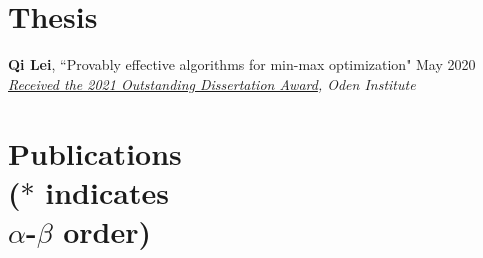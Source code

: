 \documentclass[margin, 10pt]{res} %
\begin{document}
\begin{resume}
\begin{itemize}[noitemsep]
\end{itemize}








\section{Thesis} 
\textbf{Qi Lei}, ``Provably effective algorithms for min-max optimization" \hfill{May 2020} \\ 
\textit{\href{https://www.oden.utexas.edu/news-and-events/news/Oden-Institute-Outstanding-Dissertation-Award-Winner-2021/}{Received the 2021 Outstanding Dissertation Award}, Oden Institute}

\section{Publications\\
	\vspace{4pt}
{\footnotesize ($*$ indicates\\ $\alpha$-$\beta$ order) }}
\begin{enumerate}
	

\end{enumerate}
\end{resume}
\end{document}
